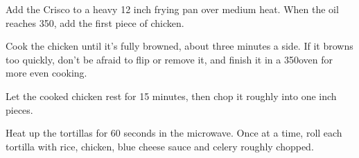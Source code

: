 \begin{recipe}

Add the Crisco to a heavy 12 inch frying pan over medium heat. When the oil reaches 350\degree, add the first piece of chicken.

Cook the chicken until it's fully browned, about three minutes a side. If it browns too quickly, don't be afraid to flip or remove it, and finish it in a 350\degree oven for more even cooking.

Let the cooked chicken rest for 15 minutes, then chop it roughly into one inch pieces.


Heat up the tortillas for 60 seconds in the microwave. Once at a time, roll each tortilla with rice, chicken, blue cheese sauce and celery roughly chopped.

\end{recipe}
